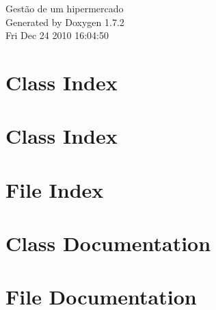 \documentclass[a4paper]{book}
\begin{document}
\hypersetup{pageanchor=false}
\begin{titlepage}
\vspace*{7cm}
\begin{center}
{\Large Gestão de um hipermercado }\\
\vspace*{1cm}
{\large Generated by Doxygen 1.7.2}\\
\vspace*{0.5cm}
{\small Fri Dec 24 2010 16:04:50}\\
\end{center}
\end{titlepage}
\clearemptydoublepage
{}
\tableofcontents
\clearemptydoublepage
{}
\hypersetup{pageanchor=true}
\chapter{Class Index}

\chapter{Class Index}

\chapter{File Index}

\chapter{Class Documentation}




























\chapter{File Documentation}




















\printindex
\end{document}
